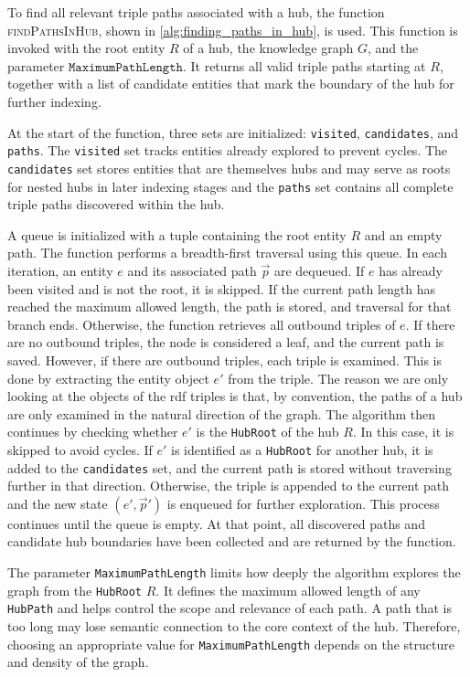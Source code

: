 To find all relevant triple paths associated with a hub, the function \textsc{findPathsInHub}, shown in \autoref{alg:finding_paths_in_hub}, is used. This function is invoked with the root entity \(R\) of a hub, the knowledge graph \(G\), and the parameter \(\texttt{MaximumPathLength}\). It returns all valid triple paths starting at \(R\), together with a list of candidate entities that mark the boundary of the hub for further indexing.

At the start of the function, three sets are initialized: \texttt{visited}, \texttt{candidates}, and \texttt{paths}. The \texttt{visited} set tracks entities already explored to prevent cycles. The \texttt{candidates} set stores entities that are themselves hubs and may serve as roots for nested hubs in later indexing stages and the \texttt{paths} set contains all complete triple paths discovered within the hub.

A queue is initialized with a tuple containing the root entity \(R\) and an empty path. The function performs a breadth-first traversal using this queue. In each iteration, an entity \(e\) and its associated path \(\vec{p}\) are dequeued. If \(e\) has already been visited and is not the root, it is skipped. If the current path length has reached the maximum allowed length, the path is stored, and traversal for that branch ends. Otherwise, the function retrieves all outbound triples of \(e\). If there are no outbound triples, the node is considered a leaf, and the current path is saved. However, if there are outbound triples, each triple is examined. This is done by extracting the entity object \(e'\) from the triple. The reason we are only looking at the objects of the \gls{rdf} triples is that, by convention, the paths of a hub are only examined in the natural direction of the graph. The algorithm then continues by checking whether \(e'\) is the \texttt{HubRoot} of the hub \(R\). In this case, it is skipped to avoid cycles. If \(e'\) is identified as a \texttt{HubRoot} for another hub, it is added to the \texttt{candidates} set, and the current path is stored without traversing further in that direction. Otherwise, the triple is appended to the current path and the new state \((e', \vec{p}')\) is enqueued for further exploration. This process continues until the queue is empty. At that point, all discovered paths and candidate hub boundaries have been collected and are returned by the function.

\begin{tcolorbox}[title=Parameter: \texttt{MaximumPathLength}]
The parameter \texttt{MaximumPathLength} limits how deeply the algorithm explores the graph from the \texttt{HubRoot} $R$. It defines the maximum allowed length of any \texttt{HubPath} and helps control the scope and relevance of each path. A path that is too long may lose semantic connection to the core context of the hub. Therefore, choosing an appropriate value for \texttt{MaximumPathLength} depends on the structure and density of the graph.
\end{tcolorbox}



